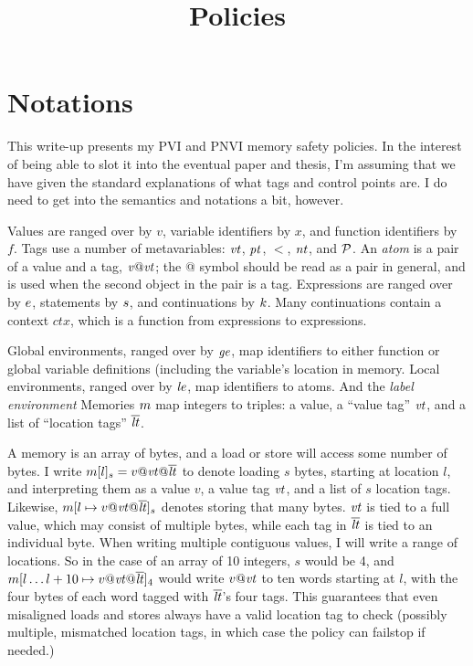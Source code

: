 \documentclass{article}
\title{Policies}
\begin{document}


\section{Notations}

This write-up presents my PVI and PNVI memory safety policies. In the interest of being able
to slot it into the eventual paper and thesis, I'm assuming that we have given the standard
explanations of what tags and control points are. I do need to get into the semantics and notations
a bit, however.

Values are ranged over by \(v\), variable identifiers by \(x\), and function identifiers by \(f\).
Tags use a number of metavariables: \(\mathit{vt}\), \(\mathit{pt}\), \(\lt\), \(\mathit{nt}\), and \(\mathcal{P}\).
An {\it atom} is a pair of a value and a tag, \(\mathit{v} @ \mathit{vt}\); the @ symbol should be read
as a pair in general, and is used when the second object in the pair is a tag.
Expressions are ranged over by \(e\), statements by \(s\), and continuations by \(k\).
Many continuations contain a context \(\mathit{ctx}\), which is a function from expressions
to expressions.

Global environments, ranged over by \(\mathit{ge}\), map identifiers to either function
or global variable definitions (including the variable's location in memory. Local environments,
ranged over by \(\mathit{le}\), map identifiers to atoms. And the {\em label environment}
Memories \(m\) map integers to
triples: a value, a ``value tag'' \(\mathit{vt}\), and a list of ``location tags'' \(\overline{\mathit{lt}}\).

A memory is an array of bytes, and a load or store will access some number of bytes. I write
\(m[l]_s = v@\mathit{vt} @\overline{\mathit{lt}}\) to denote loading \(s\) bytes,
starting at location \(l\), and interpreting them as a value \(v\), a value tag \(\mathit{vt}\), and a list of
\(s\) location tags. Likewise, \(m[l \mapsto v@\mathit{vt} @ \overline{\mathit{lt}}]_s\)
denotes storing that many bytes. \(\mathit{vt}\) is tied to a full value, which may consist of
multiple bytes, while each tag in \(\overline{\mathit{lt}}\) is tied to an individual byte.
When writing multiple contiguous values, I will write a range of locations. So
in the case of an array of 10 integers, \(s\) would be 4, and
\(m[l \dots l+10 \mapsto v@\mathit{vt} @ \overline{\mathit{lt}}]_4\) would write \(v@\mathit{vt}\) to ten words starting at \(l\),
with the four bytes of each word tagged with \(\overline{\mathit{lt}}\)'s four tags.
This guarantees that even misaligned loads and stores always have a valid location tag to check
(possibly multiple, mismatched location tags, in which case the policy can failstop if needed.)
\end{document}
